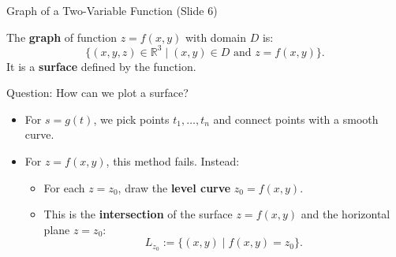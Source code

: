 \documentclass[aspectratio=169,10pt]{beamer}
\begin{document}
\begin{frame}{Graph of a Two-Variable Function (Slide 6)}
  \begin{definition}
    The \textbf{graph} of function $z = f(x, y)$ with domain $D$ is:
    \[
      \{(x, y, z) \in \mathbb{R}^3 \mid (x, y) \in D \text{ and } z = f(x, y)\}.
    \]
    It is a \textbf{surface} defined by the function.
  \end{definition}

  \begin{block}{Question: How can we plot a surface?}
    \small
    \begin{itemize}
      \item For $s = g(t)$, we pick points $t_1, \dots, t_n$ and connect points with a smooth curve.
      \item For $z = f(x, y)$, this method fails. Instead:
      \begin{itemize}
        \item For each $z = z_0$, draw the \textbf{level curve} $z_0 = f(x, y)$.
        \item This is the \textbf{intersection} of the surface $z = f(x, y)$ and the horizontal plane $z = z_0$:
        \[
          L_{z_0} := \{(x, y) \mid f(x, y) = z_0\}.
        \]
      \end{itemize}
    \end{itemize}
  \end{block}
\end{frame}
\end{document}
